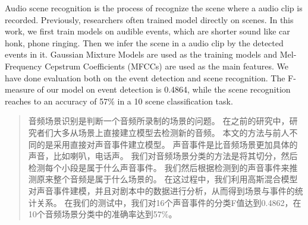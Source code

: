 
\begin{englishabstract}
Audio scene recognition is the process of recognize the scene where a audio clip is recorded. 
Previously, researchers often trained model directly on scenes. 
In this work, we first train models on audible events, which are shorter sound like car honk, phone ringing. 
Then we infer the scene in a audio clip by the detected events in it. 
Gaussian Mixture Models are used as the training models and Mel-Frequency Cepstrum Coefficients (MFCCs) are used as the main features. 
We have done evaluation both on the event detection and scene recognition. 
The F-measure of our model on event detection is 0.4864, while the scene recognition reaches to an accuracy of 57$\%$ in a 10 scene classification task.  \\  

\end{englishabstract}

\begin{abstract}
音频场景识别是判断一个音频所录制的场景的问题。
在之前的研究中，研究者们大多从场景上直接建立模型去检测新的音频。
本文的方法与前人不同的是采用直接对声音事件建立模型。
声音事件是比音频场景更加具体的声音，比如喇叭，电话声。
我们对音频场景分类的方法是将其切分，然后检测每个小段是属于什么声音事件。
我们然后根据检测到的声音事件来推测原来整个音频是属于什么场景的。 
在这过程中，我们利用高斯混合模型对声音事件建模，并且对剧本中的数据进行分析，从而得到场景与事件的统计关系。
在我们的测试中，我们对16个声音事件的分类F值达到0.4862，在10个音频场景分类中的准确率达到57$\%$。\\ 

\end{abstract}
